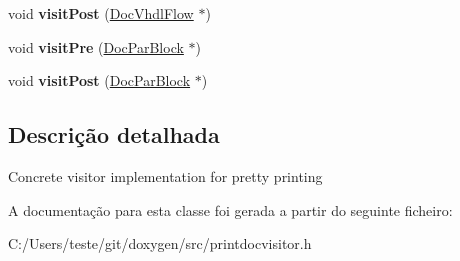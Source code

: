 \begin{DoxyCompactItemize}
\item 
\hypertarget{class_print_doc_visitor_a79febe42f6e032c27aad9a418f979eca}{void {\bfseries visit\-Post} (\hyperlink{class_doc_vhdl_flow}{Doc\-Vhdl\-Flow} $\ast$)}\label{class_print_doc_visitor_a79febe42f6e032c27aad9a418f979eca}

\item 
\hypertarget{class_print_doc_visitor_acc4035c695184dd01a26145a88c1a588}{void {\bfseries visit\-Pre} (\hyperlink{class_doc_par_block}{Doc\-Par\-Block} $\ast$)}\label{class_print_doc_visitor_acc4035c695184dd01a26145a88c1a588}

\item 
\hypertarget{class_print_doc_visitor_a4bd3a84f45e2f6dc6420638ee8e4ee27}{void {\bfseries visit\-Post} (\hyperlink{class_doc_par_block}{Doc\-Par\-Block} $\ast$)}\label{class_print_doc_visitor_a4bd3a84f45e2f6dc6420638ee8e4ee27}

\end{DoxyCompactItemize}


\subsection{Descrição detalhada}
Concrete visitor implementation for pretty printing 

A documentação para esta classe foi gerada a partir do seguinte ficheiro\-:\begin{DoxyCompactItemize}
\item 
C\-:/\-Users/teste/git/doxygen/src/printdocvisitor.\-h\end{DoxyCompactItemize}
